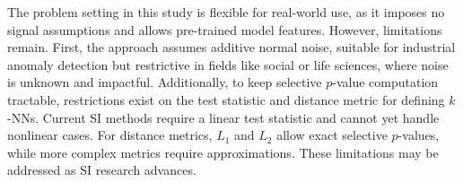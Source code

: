 The problem setting in this study is flexible for real-world use, as it imposes no signal assumptions and allows pre-trained model features.
%
However, limitations remain.
%
First, the approach assumes additive normal noise, suitable for industrial anomaly detection but restrictive in fields like social or life sciences, where noise is unknown and impactful.
%
Additionally, to keep selective $p$-value computation tractable, restrictions exist on the test statistic and distance metric for defining $k$-NNs.
%
Current SI methods require a linear test statistic and cannot yet handle nonlinear cases.
%
For distance metrics, $L_1$ and $L_2$ allow exact selective $p$-values, while more complex metrics require approximations.
%
These limitations may be addressed as SI research advances.





